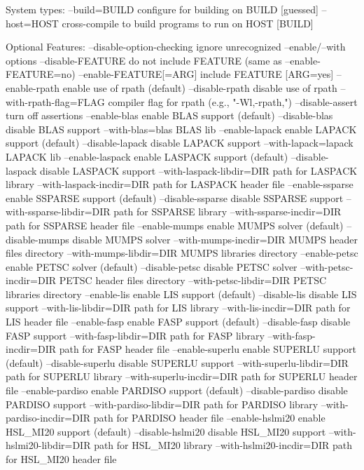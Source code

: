 \begin{evb}
System types:
  --build=BUILD     configure for building on BUILD [guessed]
  --host=HOST       cross-compile to build programs to run on HOST [BUILD]

Optional Features:
  --disable-option-checking  ignore unrecognized --enable/--with options
  --disable-FEATURE       do not include FEATURE (same as --enable-FEATURE=no)
  --enable-FEATURE[=ARG]  include FEATURE [ARG=yes]
  --enable-rpath          enable use of rpath (default)
  --disable-rpath         disable use of rpath
  --with-rpath-flag=FLAG  compiler flag for rpath (e.g., "-Wl,-rpath,")
  --disable-assert        turn off assertions
  --enable-blas         enable BLAS support (default)
  --disable-blas        disable BLAS support
  --with-blas=blas BLAS lib
  --enable-lapack         enable LAPACK support (default)
  --disable-lapack        disable LAPACK support
  --with-lapack=lapack LAPACK lib
  --enable-laspack      enable LASPACK support (default)
  --disable-laspack     disable LASPACK support
  --with-laspack-libdir=DIR path for LASPACK library
  --with-laspack-incdir=DIR path for LASPACK header file
  --enable-ssparse      enable SSPARSE support (default)
  --disable-ssparse     disable SSPARSE support
  --with-ssparse-libdir=DIR path for SSPARSE library
  --with-ssparse-incdir=DIR path for SSPARSE header file
  --enable-mumps        enable MUMPS solver (default)
  --disable-mumps       disable MUMPS solver
  --with-mumps-incdir=DIR MUMPS header files directory
  --with-mumps-libdir=DIR MUMPS libraries directory
  --enable-petsc        enable PETSC solver (default)
  --disable-petsc       disable PETSC solver
  --with-petsc-incdir=DIR PETSC header files directory
  --with-petsc-libdir=DIR PETSC libraries directory
  --enable-lis      enable LIS support (default)
  --disable-lis     disable LIS support
  --with-lis-libdir=DIR path for LIS library
  --with-lis-incdir=DIR path for LIS header file
  --enable-fasp      enable FASP support (default)
  --disable-fasp     disable FASP support
  --with-fasp-libdir=DIR path for FASP library
  --with-fasp-incdir=DIR path for FASP header file
  --enable-superlu      enable SUPERLU support (default)
  --disable-superlu     disable SUPERLU support
  --with-superlu-libdir=DIR path for SUPERLU library
  --with-superlu-incdir=DIR path for SUPERLU header file
  --enable-pardiso      enable PARDISO support (default)
  --disable-pardiso     disable PARDISO support
  --with-pardiso-libdir=DIR path for PARDISO library
  --with-pardiso-incdir=DIR path for PARDISO header file
  --enable-hslmi20      enable HSL_MI20 support (default)
  --disable-hslmi20     disable HSL_MI20 support
  --with-hslmi20-libdir=DIR path for HSL_MI20 library
  --with-hslmi20-incdir=DIR path for HSL_MI20 header file


\end{evb}

